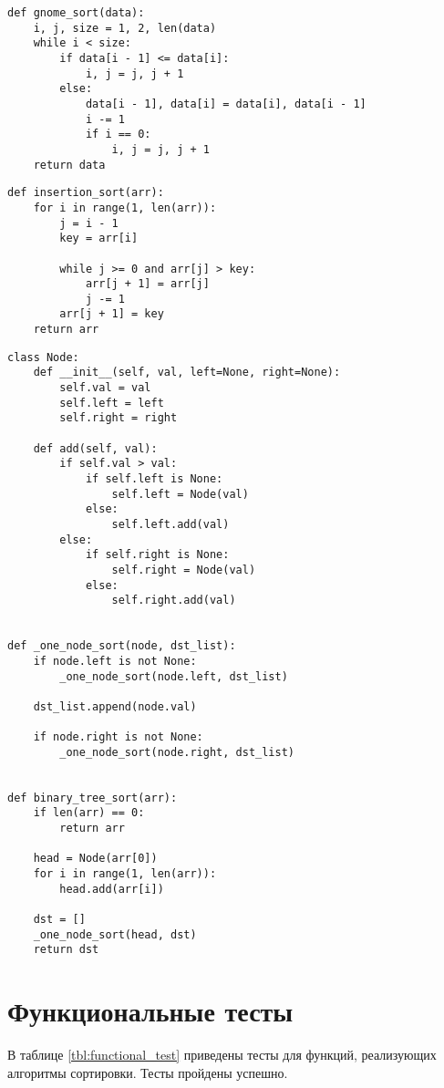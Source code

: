 \begin{lstlisting}[label=lst:heap,caption=Алгоритм гномьей сортировки]
def gnome_sort(data):
    i, j, size = 1, 2, len(data)
    while i < size:
        if data[i - 1] <= data[i]:
            i, j = j, j + 1
        else:
            data[i - 1], data[i] = data[i], data[i - 1]
            i -= 1
            if i == 0:
                i, j = j, j + 1
    return data
\end{lstlisting}

\begin{lstlisting}[label=lst:smooth,caption= Алгоритм сортировки вставками]
def insertion_sort(arr):
	for i in range(1, len(arr)):
		j = i - 1
		key = arr[i]
		
		while j >= 0 and arr[j] > key:
			arr[j + 1] = arr[j]
			j -= 1
		arr[j + 1] = key
	return arr	
\end{lstlisting}

\begin{lstlisting}[label=lst:beenary,caption=Алгоритм сортировки бинарным деревом поиска]
class Node:
    def __init__(self, val, left=None, right=None):
        self.val = val
        self.left = left
        self.right = right

    def add(self, val):
        if self.val > val:
            if self.left is None:
                self.left = Node(val)
            else:
                self.left.add(val)
        else:
            if self.right is None:
                self.right = Node(val)
            else:
                self.right.add(val)


def _one_node_sort(node, dst_list):
    if node.left is not None:
        _one_node_sort(node.left, dst_list)

    dst_list.append(node.val)

    if node.right is not None:
        _one_node_sort(node.right, dst_list)


def binary_tree_sort(arr):
    if len(arr) == 0:
        return arr

    head = Node(arr[0])
    for i in range(1, len(arr)):
        head.add(arr[i])

    dst = []
    _one_node_sort(head, dst)
    return dst
\end{lstlisting}

\section{Функциональные тесты}

В таблице \ref{tbl:functional_test} приведены тесты для функций, реализующих алгоритмы сортировки. Тесты пройдены успешно.


